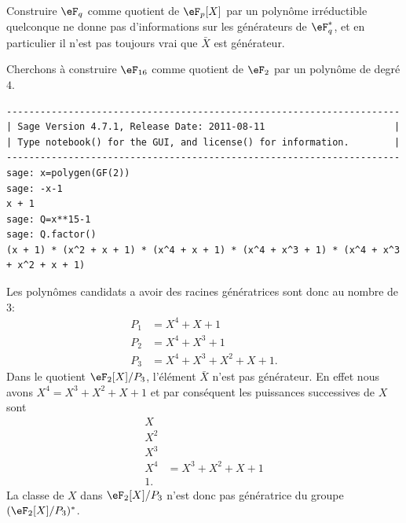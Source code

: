 Construire \( \eF_q\) comme quotient de \( \eF_p[X]\) par un polynôme irréductible quelconque ne donne pas d'informations sur les générateurs de \( \eF_q^*\), et en particulier il n'est pas toujours vrai que \( \bar X\) est générateur.

\begin{example}     \label{ExemWUdrcs}
    Cherchons à construire \( \eF_{16}\) comme quotient de \( \eF_2\) par un polynôme de degré \( 4\).
    \begin{verbatim}
----------------------------------------------------------------------
| Sage Version 4.7.1, Release Date: 2011-08-11                       |
| Type notebook() for the GUI, and license() for information.        |
----------------------------------------------------------------------
sage: x=polygen(GF(2))
sage: -x-1
x + 1
sage: Q=x**15-1
sage: Q.factor()
(x + 1) * (x^2 + x + 1) * (x^4 + x + 1) * (x^4 + x^3 + 1) * (x^4 + x^3 + x^2 + x + 1)
    \end{verbatim}
    Les polynômes candidats a avoir des racines génératrices sont donc au nombre de \( 3\):
    \begin{subequations}
        \begin{align}
            P_1&=X^4+X+1\\
            P_2&=X^4+X^3+1\\
            P_3&=X^4+X^3+X^2+X+1.
        \end{align}
    \end{subequations}
    Dans le quotient \( \eF_2[X]/P_3\), l'élément \( \bar X\) n'est pas générateur. En effet nous avons \( X^4=X^3+X^2+X+1\) et par conséquent les puissances successives de \( X\) sont
    \begin{subequations}
        \begin{align}
            X&\\
            X^2&\\
            X^3&\\
            X^4&=X^3+X^2+X+1\\
            1.
        \end{align}
    \end{subequations}
    La classe de \( X\) dans \( \eF_2[X]/P_3\) n'est donc pas génératrice du groupe \( (\eF_2[X]/P_3)^*\).


\end{example}
